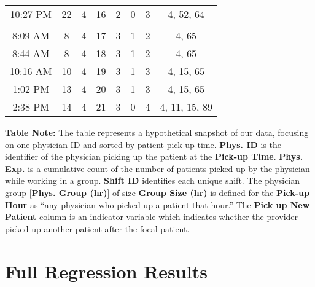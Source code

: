 \begin{table}[htbp]
{\begin{threeparttable}[t]
\begin{tabular}{cccccccc}
    10:27 PM & 22    & 4     & 16    & 2     & 0     & 3     & 4, 52, 64 \\
          &       &       &       &       &       &       &  \\
    8:09 AM & 8     & 4     & 17    & 3     & 1     & 2     & 4, 65 \\
    8:44 AM & 8     & 4     & 18    & 3     & 1     & 2     & 4, 65 \\
    10:16 AM & 10    & 4     & 19    & 3     & 1     & 3     & 4, 15, 65 \\
    1:02 PM & 13    & 4     & 20    & 3     & 1     & 3     & 4, 15, 65 \\
    2:38 PM & 14    & 4     & 21    & 3     & 0     & 4     & 4, 11, 15, 89 \\
    \end{tabular}%
    \medskip
    \begin{tablenotes}
      \footnotesize
      \item \textbf{Table Note:} The table represents a hypothetical snapshot of our data, focusing on one physician ID and sorted by patient pick-up time. \textbf{Phys. ID} is the identifier of the physician picking up the patient at the \textbf{Pick-up Time}. \textbf{Phys. Exp.} is a cumulative count of the number of patients picked up by the physician while working in a group. \textbf{Shift ID} identifies each unique shift. The physician group [\textbf{Phys. Group (hr)}] of size \textbf{Group Size (hr)} is defined for the \textbf{Pick-up Hour} as “any physician who picked up a patient that hour.” The \textbf{Pick up New Patient} column is an indicator variable which indicates whether the provider picked up another patient after the focal patient.
    \end{tablenotes}
  \end{threeparttable} }
 \end{table}

\section{Full Regression Results} \label{pu_full_reg}

